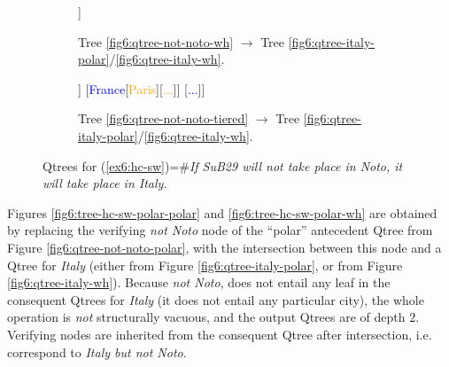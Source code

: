 \begin{figure}[H]
\begin{subfigure}[b]{.45\linewidth}
	\centering
	\scalebox{1}
	{\begin{forest}
			[CS [\textcolor{orange}{Noto}] [\fbox{\textcolor{orange}{Rome}}] [\fbox{\textcolor{orange}{...}}] [\textcolor{orange}{Paris}] [\textcolor{orange}{...}]]
	\end{forest}}
	\caption{Tree \ref{fig6:qtree-not-noto-wh} $\rightarrow$ Tree \ref{fig6:qtree-italy-polar}/\ref{fig6:qtree-italy-wh}.}\label{fig6:tree-hc-sw-wh}
\end{subfigure}\hfill
\begin{subfigure}[b]{.45\linewidth}
	\centering
	\scalebox{1}
	{\begin{forest}
			[CS [\textcolor{blue}{Italy}[\textcolor{orange}{Noto}] [\fbox{\textcolor{orange}{Rome}}] [\fbox{\textcolor{orange}{...}}]]  [\textcolor{blue}{France}[\textcolor{orange}{Paris}][\textcolor{orange}{...}]] [\textcolor{blue}{...}]]
	\end{forest}}
	\caption{Tree \ref{fig6:qtree-not-noto-tiered} $\rightarrow$ Tree \ref{fig6:qtree-italy-polar}/\ref{fig6:qtree-italy-wh}.}\label{fig6:tree-hc-sw-wh-wh}
\end{subfigure}
\caption{Qtrees for (\ref{ex6:hc-sw})=\#\textit{If SuB29 will not take place in Noto, it will take place in Italy.}}
\label{fig6:qtrees-hc-sw}
\end{figure}

Figures \ref{fig6:tree-hc-sw-polar-polar} and \ref{fig6:tree-hc-sw-polar-wh} are obtained by replacing the verifying \textit{not Noto} node of the ``polar'' antecedent Qtree from Figure \ref{fig6:qtree-not-noto-polar}, with the intersection between this node and a Qtree for \textit{Italy} (either from Figure \ref{fig6:qtree-italy-polar}, or from Figure \ref{fig6:qtree-italy-wh}). Because \textit{not Noto}, does not entail any leaf in the consequent Qtrees for \textit{Italy} (it does not entail any particular city), the whole operation is \textit{not} structurally vacuous, and the output Qtrees are of depth $2$. Verifying nodes are inherited from the consequent Qtree after intersection, i.e. correspond to \textit{Italy but not Noto}.

